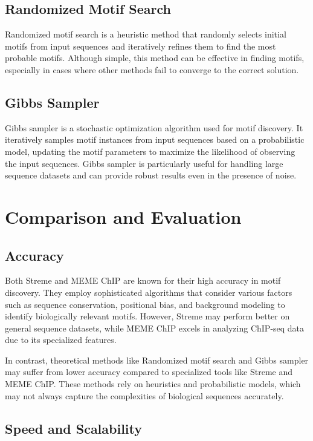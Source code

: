 \documentclass{article}
\begin{document}
\subsection{Randomized Motif Search}

Randomized motif search is a heuristic method that randomly selects initial motifs from input sequences and iteratively refines them to find the most probable motifs. Although simple, this method can be effective in finding motifs, especially in cases where other methods fail to converge to the correct solution.

\subsection{Gibbs Sampler}

Gibbs sampler is a stochastic optimization algorithm used for motif discovery. It iteratively samples motif instances from input sequences based on a probabilistic model, updating the motif parameters to maximize the likelihood of observing the input sequences. Gibbs sampler is particularly useful for handling large sequence datasets and can provide robust results even in the presence of noise.

\section{Comparison and Evaluation}

\subsection{Accuracy}

Both Streme and MEME ChIP are known for their high accuracy in motif discovery. They employ sophisticated algorithms that consider various factors such as sequence conservation, positional bias, and background modeling to identify biologically relevant motifs. However, Streme may perform better on general sequence datasets, while MEME ChIP excels in analyzing ChIP-seq data due to its specialized features.

In contrast, theoretical methods like Randomized motif search and Gibbs sampler may suffer from lower accuracy compared to specialized tools like Streme and MEME ChIP. These methods rely on heuristics and probabilistic models, which may not always capture the complexities of biological sequences accurately.

\subsection{Speed and Scalability}
\end{document}
